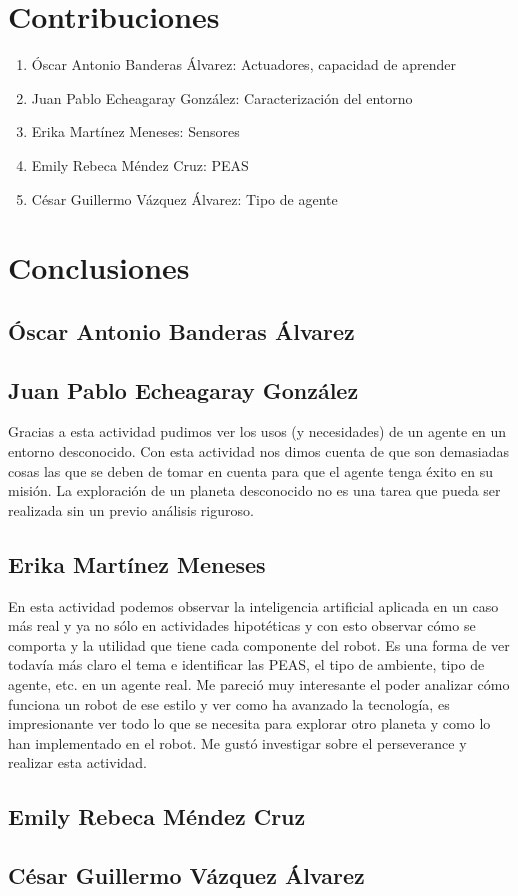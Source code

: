 \documentclass{article}
\begin{document}
    \section{Contribuciones}
        \begin{enumerate}
            \item Óscar Antonio Banderas Álvarez: Actuadores, capacidad de aprender
            \item Juan Pablo Echeagaray González: Caracterización del entorno
            \item Erika Martínez Meneses: Sensores
            \item Emily Rebeca Méndez Cruz: PEAS
            \item César Guillermo Vázquez Álvarez: Tipo de agente
        \end{enumerate}

    \section{Conclusiones}
        \subsection{Óscar Antonio Banderas Álvarez}

        \subsection{Juan Pablo Echeagaray González}
            Gracias a esta actividad pudimos ver los usos (y necesidades) de un agente en un entorno desconocido. Con esta actividad nos dimos cuenta de que son demasiadas cosas las que se deben de tomar en cuenta para que el agente tenga éxito en su misión. La exploración de un planeta desconocido no es una tarea que pueda ser realizada sin un previo análisis riguroso.

        \subsection{Erika Martínez Meneses}
            En esta actividad podemos observar la inteligencia artificial aplicada en un caso más real y ya no sólo en actividades hipotéticas y con esto observar cómo se comporta y la utilidad que tiene cada componente del robot. Es una forma de ver todavía más claro el tema e identificar las PEAS, el tipo de ambiente, tipo de agente, etc. en un agente real. Me pareció muy interesante el poder analizar cómo funciona un robot de ese estilo y ver como ha avanzado la tecnología, es impresionante ver todo lo que se necesita para explorar otro planeta y como lo han implementado en el robot. Me gustó investigar sobre el perseverance y realizar esta actividad.
            
        \subsection{Emily Rebeca Méndez Cruz}

        \subsection{César Guillermo Vázquez Álvarez}
        
    \clearpage
    \nocite{*}
    \printbibliography
\end{document}

